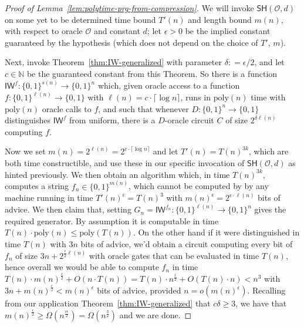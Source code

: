 \documentclass[11pt]{article}
\newcommand{\B}{\{0,1\}}
\newcommand{\SH}{\mathsf{SH}}
\renewcommand{\poly}{\mathrm{poly}}
\begin{document}
\begin{proof}[Proof of Lemma~\ref{lem:polytime-prg-from-compression}]
We will invoke $\SH(\mathcal{O},d)$ on some yet to be determined time bound $T'(n)$ and length bound $m(n)$, with respect to oracle $\mathcal{O}$ and constant $d$; let $\epsilon > 0$ be the implied constant guaranteed by the hypothesis (which does not depend on the choice of $T'$, $m$).

Next, invoke Theorem~\ref{thm:IW-generalized} with parameter $\delta: = \epsilon/2$, and let $c \in \mathbb{N}$ be the guaranteed constant from this Theorem. So there is a function $\mathsf{IW}^f: \B^{s(n)} \to \B^n$ which, given oracle access to a function $f: \B^{\ell(n)} \to \B$ with $\ell(n) = c \cdot \lceil \log n \rceil $, runs in $\poly(n)$ time with $\poly(n)$ oracle calls to $f$, and such that whenever $D: \B^n \to \B$ distinguishes $\mathsf{IW}^f$ from uniform, there is a $D$-oracle circuit $C$ of size $2^{\delta \ell(n)}$ computing $f$. 

Now we set $m(n) = 2^{\ell(n)} = 2^{c \cdot \lceil \log n \rceil}$ and let $T'(n) = T(n)^{3k}$, which are both time constructible, and use these in our specific invocation of $\SH(\mathcal{O},d)$ as hinted previously. We then obtain an algorithm which, in time $T(n)^{3k}$, computes a string $f_n \in \B^{m(n)}$, which cannot be computed by by any machine running in time $T'(n)^{\epsilon} = T(n)^3$ with $m(n)^{\epsilon} = 2^{\epsilon \cdot \ell(n)}$ bits of advice. We then claim that, setting $G_n = \mathsf{IW}^{f_n}: \B^{\ell(n)} \to \B^n$ gives the required generator. By assumption it is computable in time $T(n) \cdot \poly(n) \leq \poly(T(n))$. On the other hand if it were distinguished in time $T(n)$ with $3n$ bits of advice, we'd obtain a circuit computing every bit of $f_n$ of size $3n + 2^{\frac{\epsilon}{2} \ell(n)}$ with oracle gates that can be evaluated in time $T(n)$, hence overall we would be able to compute $f_n$ in time $T(n) \cdot m(n)^{\frac{\epsilon}{2}} + O(n \cdot T(n)) = T(n) \cdot n^{\frac{1}{2}} + O(T(n) \cdot n) < n^3$ with $3n + m(n)^{\frac{\epsilon}{2}} < m(n)^{\epsilon}$ bits of advice, provided $n  = o(m(n)^{\epsilon})$. Recalling from our application Theorem~\ref{thm:IW-generalized} that $c \delta \geq 3$, we have that $m(n)^{\frac{\epsilon}{2}} \geq \Omega(n^{\frac{c\epsilon}{2}})  = \Omega(n^{\frac{3}{2}})$ and we are done.
\end{proof}
\end{document}
